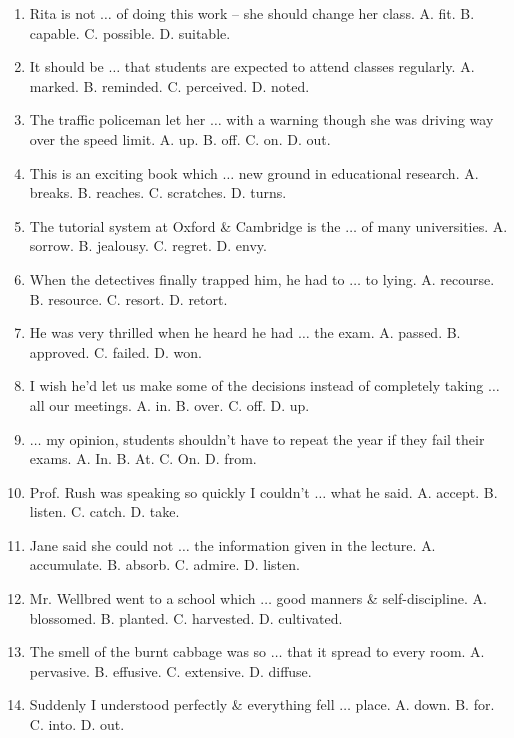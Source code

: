 \documentclass{article}
\numberwithin{equation}{section}
\begin{document}
\begin{enumerate}[leftmargin=2mm]
	\item Rita is not $\ldots$ of doing this work -- she should change her class. {\sf A.} fit. {\sf B.} capable. {\sf C.} possible. {\sf D.} suitable.
	\item It should be $\ldots$ that students are expected to attend classes regularly. {\sf A.} marked. {\sf B.} reminded. {\sf C.} perceived. {\sf D.} noted.
	\item The traffic policeman let her $\ldots$ with a warning though she was driving way over the speed limit. {\sf A.} up. {\sf B.} off. {\sf C.} on. {\sf D.} out.
	\item This is an exciting book which $\ldots$ new ground in educational research. {\sf A.} breaks. {\sf B.} reaches. {\sf C.} scratches. {\sf D.} turns.
	\item The tutorial system at Oxford \& Cambridge is the $\ldots$ of many universities. {\sf A.} sorrow. {\sf B.} jealousy. {\sf C.} regret. {\sf D.} envy.
	\item When the detectives finally trapped him, he had to $\ldots$ to lying. {\sf A.} recourse. {\sf B.} resource. {\sf C.} resort. {\sf D.} retort.
	\item He was very thrilled when he heard he had $\ldots$ the exam. {\sf A.} passed. {\sf B.} approved. {\sf C.} failed. {\sf D.} won.
	\item I wish he'd let us make some of the decisions instead of completely taking $\ldots$ all our meetings. {\sf A.} in. {\sf B.} over. {\sf C.} off. {\sf D.} up.
	\item $\ldots$ my opinion, students shouldn't have to repeat the year if they fail their exams. {\sf A.} In. {\sf B.} At. {\sf C.} On. {\sf D.} from.
	\item Prof. Rush was speaking so quickly I couldn't $\ldots$ what he said. {\sf A.} accept. {\sf B.} listen. {\sf C.} catch. {\sf D.} take.
	\item Jane said she could not $\ldots$ the information given in the lecture. {\sf A.} accumulate. {\sf B.} absorb. {\sf C.} admire. {\sf D.} listen.
	\item Mr. Wellbred went to a school which $\ldots$ good manners \& self-discipline. {\sf A.} blossomed. {\sf B.} planted. {\sf C.} harvested. {\sf D.} cultivated.
	\item The smell of the burnt cabbage was so $\ldots$ that it spread to every room. {\sf A.} pervasive. {\sf B.} effusive. {\sf C.} extensive. {\sf D.} diffuse.
	\item Suddenly I understood perfectly \& everything fell $\ldots$ place. {\sf A.} down. {\sf B.} for. {\sf C.} into. {\sf D.} out.

\end{enumerate}
\end{document}

